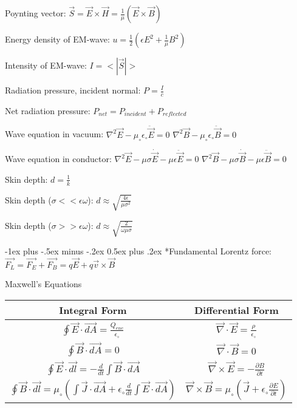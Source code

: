 \documentclass[10pt,landscape]{article}
\makeatletter
\renewcommand{\section}{\@startsection{section}{1}{0mm}%
                                {-1ex plus -.5ex minus -.2ex}%
                                {0.5ex plus .2ex}%
                                {\normalfont\large\bfseries}}
\makeatother
\begin{document}
\begin{multicols}{3}
Poynting vector:
$\vec{S} = \vec{E} \times \vec{H} = \frac{1}{\mu} (\vec{E} \times \vec{B}) $

Energy density of EM-wave:
$u = \frac{1}{2} (\epsilon E^2 + \frac{1}{\mu} B^2)$

Intensity of EM-wave:
$I = <|\vec{S}|>$

Radiation pressure, incident normal:
$P = \frac{I}{c}$

Net radiation pressure:
$P_{net} = P_{incident} + P_{reflected}$

Wave equation in vacuum:
$\nabla^2\vec{E} - \mu_{\circ}\epsilon_{\circ}\ddot{\vec{E}} = 0$
$\nabla^2\vec{B} - \mu_{\circ}\epsilon_{\circ}\ddot{\vec{B}} = 0$

Wave equation in conductor:
$\nabla^2\vec{E} - \mu\sigma\dot{\vec{E}} - \mu\epsilon\ddot{\vec{E}} = 0$
$\nabla^2\vec{B} - \mu\sigma\dot{\vec{B}} - \mu\epsilon\ddot{\vec{B}} = 0$

Skin depth:
$d = \frac{1}{k}$

Skin depth ($\sigma << \epsilon\omega$):
$d \approx \sqrt{\frac{4\epsilon}{\mu\sigma^2}}$

Skin depth ($\sigma >> \epsilon\omega$):
$d \approx \sqrt{\frac{2}{\omega\mu\sigma}}$

\section*{Fundamental}
Lorentz force:
$\vec{F_L} = \vec{F_E} + \vec{F_B} = q\vec{E} + q\vec{v} \times \vec{B}$

Maxwell's Equations
\begin{tabular}{|cc|}
\hline
Integral Form & Differential Form\\
\hline
 $\oint \vec{E} \cdot \vec{dA} = \frac{Q_{enc}}{\epsilon_{\circ}}$ & $\vec{\nabla} \cdot \vec{E} = \frac{\rho}{\epsilon_{\circ}}$ \\
 $\oint \vec{B} \cdot \vec{dA} = 0$ & $\vec{\nabla} \cdot \vec{B} = 0$ \\
 $\oint \vec{E} \cdot \vec{dl} = -\frac{d}{dt} \int \vec{B} \cdot \vec{dA}$ & $\vec{\nabla} \times \vec{E} = -\frac{\partial B}{\partial t}$ \\
 $\oint \vec{B} \cdot \vec{dl} = \mu_{\circ} ( \int \vec{J} \cdot \vec{dA} + \epsilon_{\circ} \frac{d}{dt} \int \vec{E} \cdot \vec{dA} )$ & $\vec{\nabla} \times \vec{B} = \mu_{\circ} (\vec{J}  + \epsilon_{\circ} \frac{\partial E}{\partial t})$\\
\hline
\end{tabular}


\end{multicols}
\end{document}
